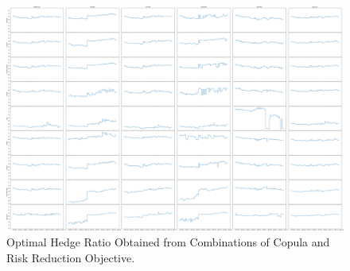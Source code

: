 \newpage
\begin{landscape}
\begin{figure}[th]
   \centering
   \includegraphics[width=\linewidth]{_pics/OHRs.png}
   \caption{Optimal Hedge Ratio Obtained from Combinations of Copula and Risk Reduction Objective.
   }
   \label{fig:OHRs}
\end{figure}
\end{landscape}
\newpage



